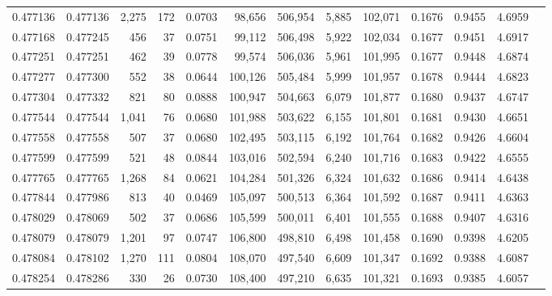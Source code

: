 \begin{tabular}{rrrrrrrrrrrrr}
0.477136 & 0.477136 & 2,275 &   172 &                                     0.0703 &  98,656 & 506,954 &   5,885 & 102,071 & 0.1676 & 0.9455 & 4.6959 \\
0.477168 & 0.477245 &   456 &    37 &                                     0.0751 &  99,112 & 506,498 &   5,922 & 102,034 & 0.1677 & 0.9451 & 4.6917 \\
0.477251 & 0.477251 &   462 &    39 &                                     0.0778 &  99,574 & 506,036 &   5,961 & 101,995 & 0.1677 & 0.9448 & 4.6874 \\
0.477277 & 0.477300 &   552 &    38 &                                     0.0644 & 100,126 & 505,484 &   5,999 & 101,957 & 0.1678 & 0.9444 & 4.6823 \\
0.477304 & 0.477332 &   821 &    80 &                                     0.0888 & 100,947 & 504,663 &   6,079 & 101,877 & 0.1680 & 0.9437 & 4.6747 \\
0.477544 & 0.477544 & 1,041 &    76 &                                     0.0680 & 101,988 & 503,622 &   6,155 & 101,801 & 0.1681 & 0.9430 & 4.6651 \\
0.477558 & 0.477558 &   507 &    37 &                                     0.0680 & 102,495 & 503,115 &   6,192 & 101,764 & 0.1682 & 0.9426 & 4.6604 \\
0.477599 & 0.477599 &   521 &    48 &                                     0.0844 & 103,016 & 502,594 &   6,240 & 101,716 & 0.1683 & 0.9422 & 4.6555 \\
0.477765 & 0.477765 & 1,268 &    84 &                                     0.0621 & 104,284 & 501,326 &   6,324 & 101,632 & 0.1686 & 0.9414 & 4.6438 \\
0.477844 & 0.477986 &   813 &    40 &                                     0.0469 & 105,097 & 500,513 &   6,364 & 101,592 & 0.1687 & 0.9411 & 4.6363 \\
0.478029 & 0.478069 &   502 &    37 &                                     0.0686 & 105,599 & 500,011 &   6,401 & 101,555 & 0.1688 & 0.9407 & 4.6316 \\
0.478079 & 0.478079 & 1,201 &    97 &                                     0.0747 & 106,800 & 498,810 &   6,498 & 101,458 & 0.1690 & 0.9398 & 4.6205 \\
0.478084 & 0.478102 & 1,270 &   111 &                                     0.0804 & 108,070 & 497,540 &   6,609 & 101,347 & 0.1692 & 0.9388 & 4.6087 \\
0.478254 & 0.478286 &   330 &    26 &                                     0.0730 & 108,400 & 497,210 &   6,635 & 101,321 & 0.1693 & 0.9385 & 4.6057 \\

\end{tabular}
